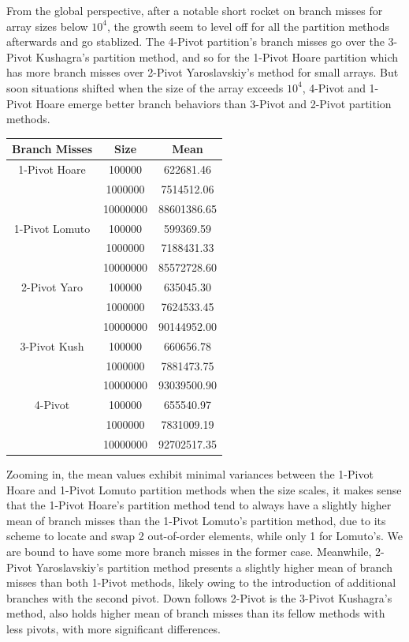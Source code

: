 \documentclass[a4paper,oneside,12pt]{book}
\begin{document}
From the global perspective, after a notable short rocket on branch misses for array sizes below $10^4$, the growth seem to level off for all the partition methods afterwards and go stablized. 
The 4-Pivot partition's branch misses go over the 3-Pivot Kushagra's partition method, and so for the 1-Pivot Hoare partition which has more branch misses over 2-Pivot Yaroslavskiy's method for small arrays.
But soon situations shifted when the size of the array exceeds $10^4$, 4-Pivot and 1-Pivot Hoare emerge better branch behaviors than 3-Pivot and 2-Pivot partition methods.

\begin{center}
    \small
    \begin{tabular}{ |c c | c | }
        \hline
        Branch Misses   & Size     & Mean         \\
        \hline
        1-Pivot Hoare   & 100000   & 622681.46    \\
                        & 1000000  & 7514512.06   \\
                        & 10000000 & 88601386.65  \\
        \hline
        1-Pivot Lomuto  & 100000   & 599369.59    \\
                        & 1000000  & 7188431.33   \\
                        & 10000000 & 85572728.60  \\
        \hline
        2-Pivot Yaro    & 100000   & 635045.30    \\
                        & 1000000  & 7624533.45   \\
                        & 10000000 & 90144952.00  \\
        \hline
        3-Pivot Kush    & 100000   & 660656.78    \\
                        & 1000000  & 7881473.75   \\
                        & 10000000 & 93039500.90  \\
        \hline
        4-Pivot         & 100000   & 655540.97    \\
                        & 1000000  & 7831009.19   \\
                        & 10000000 & 92702517.35  \\
        \hline
    \end{tabular}
    \end{center}

Zooming in, the mean values exhibit minimal variances between the 1-Pivot Hoare and 1-Pivot Lomuto partition methods when the size scales,
it makes sense that the 1-Pivot Hoare's partition method tend to always have a slightly higher mean of branch misses than the 1-Pivot Lomuto's partition method, due to its scheme to locate and swap 2 out-of-order elements, while only 1 for Lomuto's.
We are bound to have some more branch misses in the former case. Meanwhile, 2-Pivot Yaroslavskiy's partition method presents a slightly higher mean of branch misses than both 1-Pivot methods, likely owing to the introduction of additional branches with the second pivot.
Down follows 2-Pivot is the 3-Pivot Kushagra's method, also holds higher mean of branch misses than its fellow methods with less pivots, with more significant differences.
\end{document}
